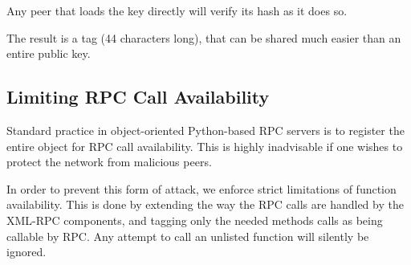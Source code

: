Any peer that loads the key directly will verify its hash as it does so.

The result is a tag (44 characters long), that can be shared much easier than an entire public key.

\subsection{Limiting RPC Call Availability}

Standard practice in object-oriented Python-based RPC servers is to register the entire object for RPC call availability. This is highly inadvisable if one wishes to protect the network from malicious peers.

In order to prevent this form of attack, we enforce strict limitations of function availability. This is done by extending the way the RPC calls are handled by the XML-RPC components, and tagging only the needed methods calls as being callable by RPC. Any attempt to call an unlisted function will silently be ignored.
